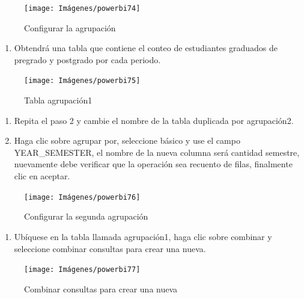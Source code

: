 \documentclass[
]{book}
\providecommand{\tightlist}{%
  \setlength{\itemsep}{0pt}\setlength{\parskip}{0pt}}
\begin{document}
\begin{figure}

{\centering \texttt{[image: Imágenes/powerbi74]} 

}

\caption{Configurar la agrupación}\label{fig:paso4porcentajes-fig}
\end{figure}

\begin{enumerate}
\def\labelenumi{\arabic{enumi}.}
\setcounter{enumi}{4}
\tightlist
\item
  Obtendrá una tabla que contiene el conteo de estudiantes graduados de pregrado y postgrado por cada periodo.
\end{enumerate}

\begin{figure}

{\centering \texttt{[image: Imágenes/powerbi75]} 

}

\caption{Tabla agrupación1}\label{fig:paso5porcentajes-fig}
\end{figure}

\begin{enumerate}
\def\labelenumi{\arabic{enumi}.}
\setcounter{enumi}{5}
\item
  Repita el paso 2 y cambie el nombre de la tabla duplicada por agrupación2.
\item
  Haga clic sobre agrupar por, seleccione básico y use el campo YEAR\_SEMESTER, el nombre de la nueva columna será cantidad semestre, nuevamente debe verificar que la operación sea recuento de filas, finalmente clic en aceptar.
\end{enumerate}

\begin{figure}

{\centering \texttt{[image: Imágenes/powerbi76]} 

}

\caption{Configurar la segunda agrupación}\label{fig:paso7porcentajes-fig}
\end{figure}

\begin{enumerate}
\def\labelenumi{\arabic{enumi}.}
\setcounter{enumi}{7}
\tightlist
\item
  Ubíquese en la tabla llamada agrupación1, haga clic sobre combinar y seleccione combinar consultas para crear una nueva.
\end{enumerate}

\begin{figure}

{\centering \texttt{[image: Imágenes/powerbi77]} 

}

\caption{Combinar consultas para crear una nueva}\label{fig:paso8porcentajes-fig}
\end{figure}
\end{document}
